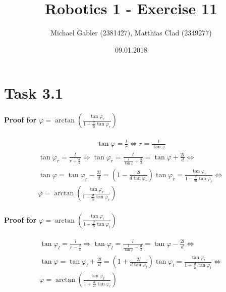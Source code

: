 \documentclass{article}
\begin{document}
	\author{Michael Gabler (2381427), Matthias Clad (2349277)}
	\title{Robotics 1 - Exercise 11}
	\date{09.01.2018}
	\maketitle
	
	\newpage
	
	\tableofcontents
	
	\newpage
	
	\section{Task 3.1}
	\paragraph{Proof for $\varphi = \arctan(\frac{\tan \varphi_{r}}{1-\frac{d}{2l}\tan \varphi_{r}})$}
	
	\begin{gather}
	\tan \varphi = \frac{l}{r}
	\Leftrightarrow
	r = \frac{l}{\tan \varphi}
	\end{gather}
	\begin{gather}
	\nonumber \tan \varphi_{r} = \frac{l}{r + \frac{d}{2}} \Rightarrow 
	\tan \varphi_{r} = \frac{l}{\frac{l}{\tan \varphi} + \frac{d}{2}} = \tan \varphi + \frac{2l}{d}
	\Leftrightarrow\\
	\nonumber \tan \varphi = \tan \varphi_{r} - \frac{2l}{d} = (1 - \frac{2l}{d \tan \varphi_{r}}) \tan \varphi_{r} = \frac{\tan \varphi_{r}}{1 - \frac{d}{2l} \tan \varphi_{r}}
	\Leftrightarrow\\
	\varphi = \arctan(\frac{\tan \varphi_{r}}{1-\frac{d}{2l}\tan \varphi_{r}})
	\end{gather}
	
	\paragraph{Proof for $\varphi = \arctan(\frac{\tan \varphi_{l}}{1+\frac{d}{2l}\tan \varphi_{l}})$}
	
	\begin{gather}
	\nonumber \tan \varphi_{l} = \frac{l}{r - \frac{d}{2}} \Rightarrow 
	\tan \varphi_{l} = \frac{l}{\frac{l}{\tan \varphi} - \frac{d}{2}} = \tan \varphi - \frac{2l}{d}
	\Leftrightarrow\\
	\nonumber \tan \varphi = \tan \varphi_{l} + \frac{2l}{d} = (1 + \frac{2l}{d \tan \varphi_{l}}) \tan \varphi_{l} = \frac{\tan \varphi_{l}}{1 + \frac{d}{2l} \tan \varphi_{l}}
	\Leftrightarrow\\
	\varphi = \arctan(\frac{\tan \varphi_{l}}{1+\frac{d}{2l}\tan \varphi_{l}})
	\end{gather}
	
\end{document}
